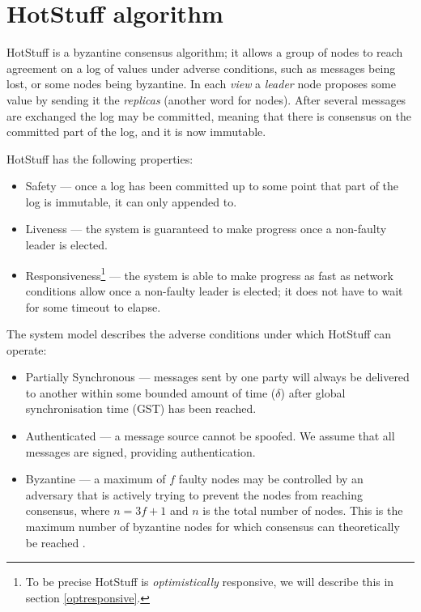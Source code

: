 
\section{HotStuff algorithm} \label{hotstufftheory}
HotStuff is a byzantine consensus algorithm; it allows a group of nodes to reach agreement on a log of values under adverse conditions, such as messages being lost, or some nodes being byzantine. In each \textit{view} a \textit{leader} node proposes some value by sending it the \textit{replicas} (another word for nodes). After several messages are exchanged the log may be committed, meaning that there is consensus on the committed part of the log, and it is now immutable.

HotStuff has the following properties:
\begin{itemize}
	\item Safety --- once a log has been committed up to some point that part of the log is immutable, it can only appended to.
	\item Liveness --- the system is guaranteed to make progress once a non-faulty leader is elected.
	\item Responsiveness\footnote{To be precise HotStuff is \textit{optimistically} responsive, we will describe this in section \ref{optresponsive}.} --- the system is able to make progress as fast as network conditions allow once a non-faulty leader is elected; it does not have to wait for some timeout to elapse.
\end{itemize}

The system model describes the adverse conditions under which HotStuff can operate:
\begin{itemize}
	\item Partially Synchronous --- messages sent by one party will always be delivered to another within some bounded amount of time ($\delta$) after global synchronisation time (GST) has been reached.
	\item Authenticated --- a message source cannot be spoofed. We assume that all messages are signed, providing authentication.
	\item Byzantine --- a maximum of $f$ faulty nodes may be controlled by an adversary that is actively trying to prevent the nodes from reaching consensus, where $n = 3f + 1$ and $n$ is the total number of nodes. This is the maximum number of byzantine nodes for which consensus can theoretically be reached \cite{pease_reaching_1980}\cite{fischer_easy_nodate}.
\end{itemize}

